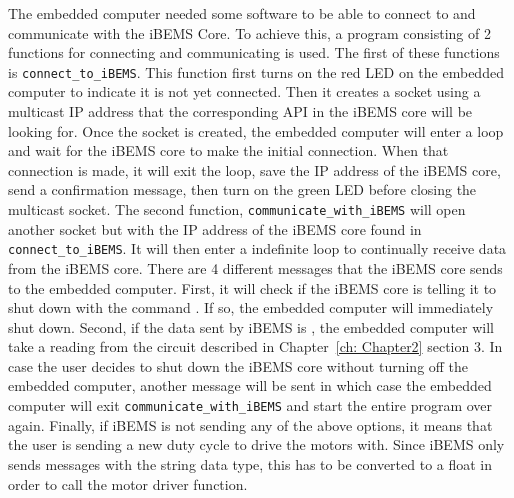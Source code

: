 The embedded computer needed some software to be able to connect to and communicate with the iBEMS Core. To achieve this, a program consisting of 2 functions for connecting and communicating is used.
\medbreak
The first of these functions is \texttt{connect\_to\_iBEMS}. This function first turns on the red LED on the embedded computer to indicate it is not yet connected. Then it creates a socket using a multicast IP address that the corresponding API in the iBEMS core will be looking for. Once the socket is created, the embedded computer will enter a loop and wait for the iBEMS core to make the initial connection. When that connection is made, it will exit the loop, save the IP address of the iBEMS core, send a confirmation message, then turn on the green LED before closing the multicast socket.
\medbreak
The second function, \texttt{communicate\_with\_iBEMS} will open another socket but with the IP address of the iBEMS core found in \texttt{connect\_to\_iBEMS}. It will then enter a indefinite loop to continually receive data from the iBEMS core. There are 4 different messages that the iBEMS core sends to the embedded computer. First, it will check if the iBEMS core is telling it to shut down with the command . If so, the embedded computer will immediately shut down. Second, if the data sent by iBEMS is , the embedded computer will take a reading from the circuit described in Chapter~\ref{ch: Chapter2} section 3. In case the user decides to shut down the iBEMS core without turning off the embedded computer, another message  will be sent in which case the embedded computer will exit \texttt{communicate\_with\_iBEMS} and start the entire program over again. Finally, if iBEMS is not sending any of the above options, it means that the user is sending a new duty cycle to drive the motors with. Since iBEMS only sends messages with the string data type, this has to be converted to a float in order to call the motor driver function. 


